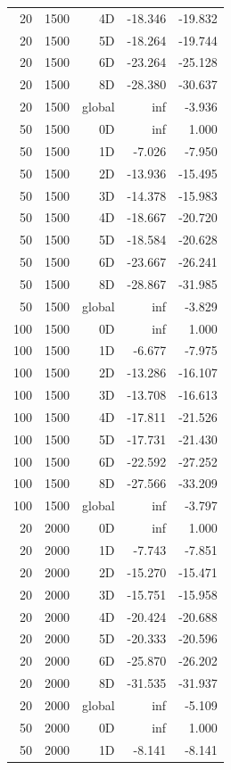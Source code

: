 \begin{longtable}{rrrrr}
20 & 1500 & 4D & -18.346 & -19.832 \\
20 & 1500 & 5D & -18.264 & -19.744 \\
20 & 1500 & 6D & -23.264 & -25.128 \\
20 & 1500 & 8D & -28.380 & -30.637 \\
20 & 1500 & global & inf & -3.936 \\
50 & 1500 & 0D & inf & 1.000 \\
50 & 1500 & 1D & -7.026 & -7.950 \\
50 & 1500 & 2D & -13.936 & -15.495 \\
50 & 1500 & 3D & -14.378 & -15.983 \\
50 & 1500 & 4D & -18.667 & -20.720 \\
50 & 1500 & 5D & -18.584 & -20.628 \\
50 & 1500 & 6D & -23.667 & -26.241 \\
50 & 1500 & 8D & -28.867 & -31.985 \\
50 & 1500 & global & inf & -3.829 \\
100 & 1500 & 0D & inf & 1.000 \\
100 & 1500 & 1D & -6.677 & -7.975 \\
100 & 1500 & 2D & -13.286 & -16.107 \\
100 & 1500 & 3D & -13.708 & -16.613 \\
100 & 1500 & 4D & -17.811 & -21.526 \\
100 & 1500 & 5D & -17.731 & -21.430 \\
100 & 1500 & 6D & -22.592 & -27.252 \\
100 & 1500 & 8D & -27.566 & -33.209 \\
100 & 1500 & global & inf & -3.797 \\
20 & 2000 & 0D & inf & 1.000 \\
20 & 2000 & 1D & -7.743 & -7.851 \\
20 & 2000 & 2D & -15.270 & -15.471 \\
20 & 2000 & 3D & -15.751 & -15.958 \\
20 & 2000 & 4D & -20.424 & -20.688 \\
20 & 2000 & 5D & -20.333 & -20.596 \\
20 & 2000 & 6D & -25.870 & -26.202 \\
20 & 2000 & 8D & -31.535 & -31.937 \\
20 & 2000 & global & inf & -5.109 \\
50 & 2000 & 0D & inf & 1.000 \\
50 & 2000 & 1D & -8.141 & -8.141 \\

\end{longtable}

